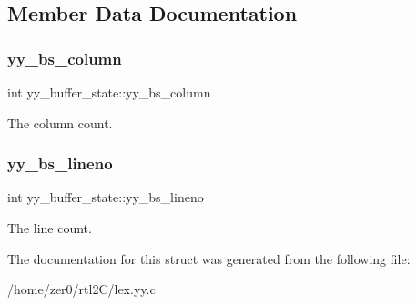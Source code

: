 \subsection{Member Data Documentation}
\mbox{\label{structyy__buffer__state_a10c4fcd8be759e6bf11e6d3e8cdb0307}} 
\subsubsection{\texorpdfstring{yy\+\_\+bs\+\_\+column}{yy\_bs\_column}}
{\footnotesize\ttfamily int yy\+\_\+buffer\+\_\+state\+::yy\+\_\+bs\+\_\+column}

The column count. \mbox{\label{structyy__buffer__state_a818e94bc9c766e683c60df1e9fd01199}} 
\subsubsection{\texorpdfstring{yy\+\_\+bs\+\_\+lineno}{yy\_bs\_lineno}}
{\footnotesize\ttfamily int yy\+\_\+buffer\+\_\+state\+::yy\+\_\+bs\+\_\+lineno}

The line count. 

The documentation for this struct was generated from the following file\+:\begin{DoxyCompactItemize}
\item 
/home/zer0/rtl2\+C/lex.\+yy.\+c\end{DoxyCompactItemize}
